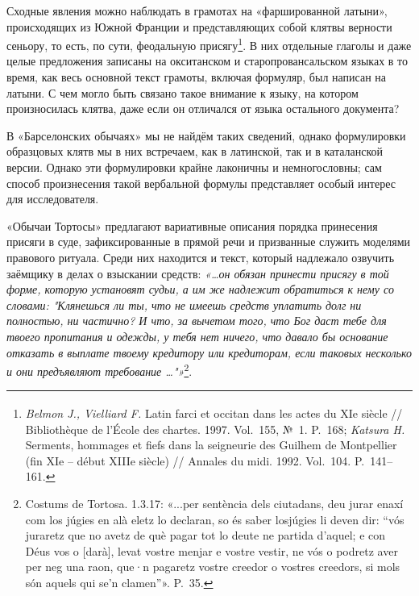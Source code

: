 Сходные явления можно наблюдать в грамотах на «фаршированной латыни», происходящих из Южной Франции и представляющих собой клятвы верности сеньору, то есть, по сути, феодальную присягу\footnote{\textsuperscript{ }\emph{Belmon J., Vielliard F.} Latin farci et occitan dans les actes du XIe siècle // Bibliothèque de l'École des chartes. 1997. Vol.~155, №~1. P.~168; \emph{Katsura H. }Serments, hommages et fiefs dans la seigneurie des Guilhem de Montpellier (fin XIe -- début XIIIe siècle) // Annales du midi. 1992. Vol.~104. P.~141--161.}. В них отдельные глаголы и даже целые предложения записаны на окситанском и старопровансальском языках в то время, как весь основной текст грамоты, включая формуляр, был написан на латыни. С чем могло быть связано такое внимание к языку, на котором произносилась клятва, даже если он отличался от языка остального документа?

В «Барселонских обычаях» мы не найдём таких сведений, однако формулировки образцовых клятв мы в них встречаем, как в латинской, так и в каталанской версии. Однако эти формулировки крайне лаконичны и немногословны; сам способ произнесения такой вербальной формулы представляет особый интерес для исследователя.

«Обычаи Тортосы» предлагают вариативные описания порядка принесения присяги в суде, зафиксированные в прямой речи и призванные служить моделями правового ритуала. Среди них находится и текст, который надлежало озвучить заёмщику в делах о взыскании средств: \emph{«…он обязан принести присягу в той форме, которую установят судьи, а им же надлежит обратиться к нему со словами: "Клянешься ли ты, что не имеешь средств уплатить долг ни полностью, ни частично? И что, за вычетом того, что Бог даст тебе для твоего пропитания и одежды, у тебя нет ничего, что давало бы основание отказать в выплате твоему кредитору или кредиторам, если таковых несколько и они предъявляют требование …"»}\footnote{Costums de Tortosa. 1.3.17: «...per sentència dels ciutadans, deu jurar enaxí com los júgies en alà eletz lo declaran, so és saber losjúgies li deven dir: “vós juraretz que no avetz de què pagar tot lo deute ne partida d'aquel; e con Déus vos o [darà], levat vostre menjar e vostre vestir, ne vós o podretz aver per neg una raon, que·n pagaretz vostre creedor o vostres creedors, si mols són aquels qui se'n clamen”». P.~35.}.

